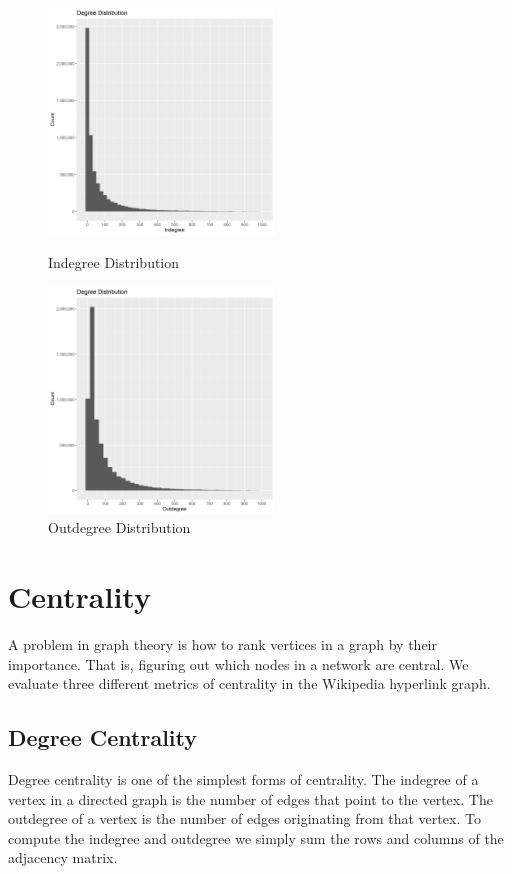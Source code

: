 \documentclass{article}
\begin{document}
\begin{figure}[H]
    \centering
    \parbox{6cm}{
    \includegraphics[width=6cm]{in_degree_dist}
    \caption{Indegree Distribution}
    \label{fig:2figsA}}
    \qquad
    \begin{minipage}{6cm}
    \includegraphics[width=6cm]{out_degree_dist}
    \caption{Outdegree Distribution}
    \label{fig:2figsB}
    \end{minipage}
\end{figure}


\section{Centrality}

A problem in graph theory is how to rank vertices in a graph by their importance. That is, figuring out which nodes in a network are central.
We evaluate three different metrics of centrality in the Wikipedia hyperlink graph.


\subsection{Degree Centrality}

Degree centrality is one of the simplest forms of centrality.
The indegree of a vertex in a directed graph is the number of edges that point to the vertex.
The outdegree of a vertex is the number of edges originating from that vertex.
To compute the indegree and outdegree we simply sum the rows and columns of the adjacency matrix.
\end{document}
